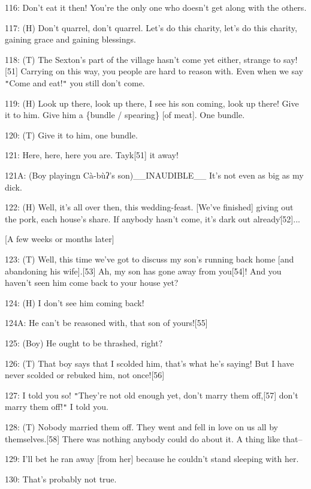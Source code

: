 116: Don't eat it then! You're the only one who doesn't get along with the others.

117: (H) Don't quarrel, don't quarrel. Let's do this charity, let's do this charity,
gaining grace and gaining blessings.

118: (T) The Sexton's part of the village hasn't come yet either, strange to say![51]
Carrying on this way, you people are hard to reason with. Even when we say \texttt{"}Come
and eat!\texttt{"} you still don't come.

119: (H) Look up there, look up there, I see his son coming, look up there! Give
it to him. Give him a \{bundle / spearing\} [of meat]. One bundle.

120: (T) Give it to him, one bundle.

121: Here, here, here you are. Tayk[51] it away!

121A: (Boy playingn Cà-bùʔ's son)\_\_INAUDIBLE\_\_ It's not even as big as my
dick.

122: (H) Well, it's all over then, this wedding-feast. [We've finished] giving
out the pork, each house's share. If anybody hasn't come, it's dark out already\.[52]...

\begin{center}
[A few weeks or months later]
\end{center}

\leftskip=0pt
123: (T) Well, this time we've got to discuss my son's running back home [and abandoning
his wife].[53] Ah, my son has gone away from you[54]! And you haven't seen him
come back to your house yet?

124: (H) I don't see him coming back!

124A: He can't be reasoned with, that son of yours![55]

125: (Boy) He ought to be thrashed, right?

126: (T) That boy says that I scolded him, that's what he's saying! But I have
never scolded or rebuked him, not once![56]

127: I told you so! \texttt{"}They're not old enough yet, don't marry them off,[57]
don't marry them off!\texttt{"} I told you.

128: (T) Nobody married them off. They went and fell in love on us all by themselves.[58]
There was nothing anybody could do about it. A thing like that--

129: I'll bet he ran away [from her] because he couldn't stand sleeping with her.

130: That's probably not true.

